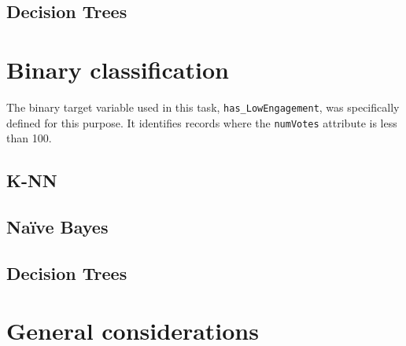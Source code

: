 \subsection*{Decision Trees}



\section{Binary classification}\label{sec:binary_classification}
The binary target variable used in this task, \texttt{has\_LowEngagement}, was specifically defined for this purpose. 
It identifies records where the \texttt{numVotes} attribute is less than 100.
\subsection*{K-NN}
\subsection*{Naïve Bayes}
\subsection*{Decision Trees}


\section{General considerations}\label{sec:general_considerations}
